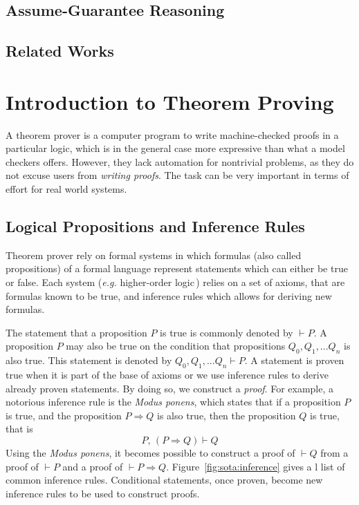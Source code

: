 \documentclass[oneside,a4paper]{memoir}
\theoremstyle{break}
\begin{document}
\subsection{Assume-Guarantee Reasoning}

\subsection{Related Works}

\section{Introduction to Theorem Proving}

A theorem prover is a computer program to write machine-checked proofs in a
particular logic, which is in the general case more expressive than what a model
checkers offers.
%
However, they lack automation for nontrivial problems, as they do not excuse
users from \emph{writing proofs}.
%
The task can be very important in terms of effort for real world systems.

\subsection{Logical Propositions and Inference Rules}

Theorem prover rely on formal systems in which formulas (also called
propositions) of a formal language represent statements which can either be true
or false.
%
Each system (\emph{e.g.} higher-order logic\,\cite{leivant1994hol}) relies on a
set of axioms, that are formulas known to be true, and inference rules which
allows for deriving new formulas.

The statement that a proposition \( P \) is true is commonly denoted by
\( \vdash P \).
%
A proposition \( P \) may also be true on the condition that propositions
\( Q_0, Q_1, ... Q_n \) is also true.
%
This statement is denoted by \( Q_0, Q_1, ... Q_n \vdash P \).
%
A statement is proven true when it is part of the base of axioms or we use
inference rules to derive already proven statements.
%
By doing so, we construct a \emph{proof}.
%
For example, a notorious inference rule is the \emph{Modus ponens}, which states
that if a proposition \( P \) is true, and the proposition \( P \Rightarrow Q \)
is also true, then the proposition \( Q \) is true, that is
%
\[
  P\text{, }(P \Rightarrow Q) \vdash Q
\]
%
Using the \emph{Modus ponens}, it becomes possible to construct a proof of
\( \vdash Q \) from a proof of \( \vdash P \) and a proof of
\( \vdash P \Rightarrow Q \).
%
Figure~\ref{fig:sota:inference} gives a l list of common inference rules.
%
Conditional statements, once proven, become new inference rules to be used to
construct proofs.
\end{document}
